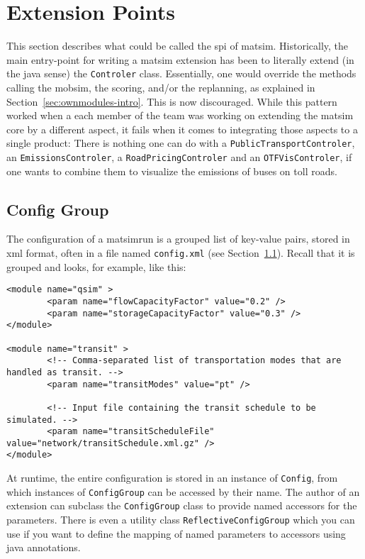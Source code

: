 \section{Extension Points}
\label{sec:matsim-spi}
This section describes what could be called the \gls{spi} of \gls{matsim}.
Historically, the main entry-point for writing a \gls{matsim} \gls{extension} has been to literally extend (in the \gls{java} sense)
the \lstinline|Controler| class. Essentially, one would override the methods calling the \gls{mobsim}, the scoring, and/or the replanning, as explained in Section~\ref{sec:ownmodules-intro}. This is now discouraged. While this pattern worked when a each member of the team was working on extending the \gls{matsim} core by a different aspect, it fails when it comes to
integrating those aspects to a single product: There is nothing one can do with a \lstinline|PublicTransportControler|, an \lstinline|EmissionsControler|, a \lstinline|RoadPricingControler| and an \lstinline|OTFVisControler|, if one wants to combine them to visualize the emissions of buses on toll roads.

\subsection{Config Group}
\label{sec:config}
The configuration of a \gls{matsimrun} is a grouped list of key-value pairs, stored in \gls{xml} format, often in a file named \lstinline|config.xml| (see Section~\ref{sec:config}).
Recall that it is grouped and looks, for example, like this:
%
\begin{lstlisting}
<module name="qsim" >
		<param name="flowCapacityFactor" value="0.2" />
		<param name="storageCapacityFactor" value="0.3" />
</module>

<module name="transit" >
		<!-- Comma-separated list of transportation modes that are handled as transit. -->
		<param name="transitModes" value="pt" />

		<!-- Input file containing the transit schedule to be simulated. -->
		<param name="transitScheduleFile" value="network/transitSchedule.xml.gz" />
</module>
\end{lstlisting}

At runtime, the entire configuration is stored in an instance of \lstinline|Config|, from which instances of \lstinline|ConfigGroup| can be accessed by their name.
The author of an extension can subclass the \lstinline|ConfigGroup| class to provide named accessors for the parameters.
There is even a utility class \lstinline|ReflectiveConfigGroup| which you can use if you want to define the mapping of named parameters to accessors using \gls{java} annotations.

